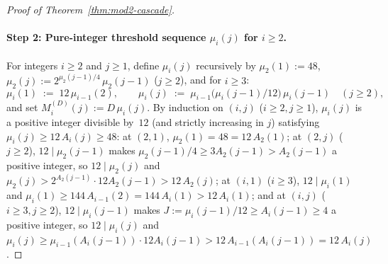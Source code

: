 \documentclass[11pt]{article}
\theoremstyle{definition}
\theoremstyle{remark}
\begin{document}
\begin{proof}[Proof of Theorem~\ref{thm:mod2-cascade}]
\paragraph{Step 2: Pure-integer threshold sequence $\mu_i(j)$ for $i \ge 2$.}
For integers $i \ge 2$ and $j \ge 1$, define $\mu_i(j)$ recursively by $\mu_2(1) := 48$, $\mu_2(j) := 2^{\mu_2(j-1)/4}\,\mu_2(j - 1)$ ($j \ge 2$), and for $i \ge 3$:
\[
\mu_i(1) \;:=\; 12\,\mu_{i-1}(2), \qquad
\mu_i(j) \;:=\; \mu_{i-1}\big(\mu_i(j - 1)/12\big)\,\mu_i(j - 1) \quad (j \ge 2),
\]
and set $M^{(D)}_i(j) := D\,\mu_i(j)$. By induction on $(i, j)$ ($i \ge 2, j \ge 1$), $\mu_i(j)$ is a positive integer divisible by~$12$ (and strictly increasing in $j$) satisfying $\mu_i(j) \ge 12\,A_i(j) \ge 48$: at $(2, 1)$, $\mu_2(1) = 48 = 12\,A_2(1)$; at $(2, j)$ ($j \ge 2$), $12 \mid \mu_2(j - 1)$ makes $\mu_2(j - 1)/4 \ge 3 A_2(j - 1) > A_2(j - 1)$ a positive integer, so $12 \mid \mu_2(j)$ and $\mu_2(j) > 2^{A_2(j-1)} \cdot 12 A_2(j - 1) > 12\,A_2(j)$; at $(i, 1)$ ($i \ge 3$), $12 \mid \mu_i(1)$ and $\mu_i(1) \ge 144\,A_{i-1}(2) = 144\,A_i(1) > 12\,A_i(1)$; and at $(i, j)$ ($i \ge 3, j \ge 2$), $12 \mid \mu_i(j - 1)$ makes $J := \mu_i(j - 1)/12 \ge A_i(j - 1) \ge 4$ a positive integer, so $12 \mid \mu_i(j)$ and $\mu_i(j) \ge \mu_{i-1}(A_i(j - 1)) \cdot 12 A_i(j - 1) > 12\,A_{i-1}(A_i(j - 1)) = 12\,A_i(j)$.


\end{proof}
\end{document}
